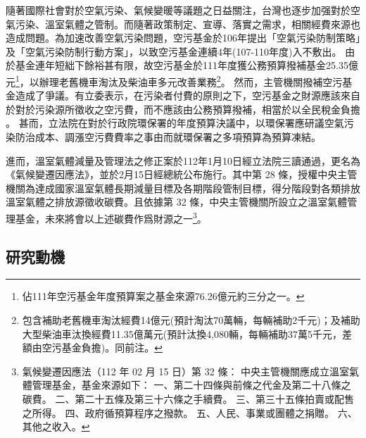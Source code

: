 \documentclass[12pt,a4paper]{article}
\begin{document}
隨著國際社會對於空氣污染、氣候變暖等議題之日益關注，台灣也逐步加强對於空氣污染、溫室氣體之管制。而隨著政策制定、宣導、落實之需求，相關經費來源也造成問題。為加速改善空氣污染問題，空污基金於106年提出「空氣污染防制策略」及「空氣污染防制行動方案」，以致空污基金連續4年(107-110年度)入不敷出。
由於基金連年短絀下餘裕甚有限，故空污基金於111年度獲公務預算撥補基金25.35億元\footnote{佔111年空污基金年度預算案之基金來源76.26億元約三分之一。}，以辦理老舊機車淘汰及柴油車多元改善業務\footnote{包含補助老舊機車淘汰經費14億元(預計淘汰70萬輛，每輛補助2千元)；及補助大型柴油車汰換經費11.35億萬元(預計汰換4,080輛，每輛補助37萬5千元，差額由空污基金負擔)。同前注。}。
然而，主管機關撥補空污基金造成了爭議。有立委表示，在污染者付費的原則之下，空污基金之財源應該來自於對於污染源所徵收之空污費，而不應該由公務預算撥補，相當於以全民稅金負擔
。
甚而，立法院在對於行政院環保署的年度預算決議中，以環保署應研議空氣污染防治成本、調漲空污費費率之事由而就環保署之多項預算為預算凍結。

進而，溫室氣體減量及管理法之修正案於112年1月10日經立法院三讀通過，更名為《氣候變遷因應法》，並於2月15日經總統公布施行。其中第 28 條，授權中央主管機關為達成國家溫室氣體長期減量目標及各期階段管制目標，得分階段對各類排放溫室氣體之排放源徵收碳費。且依據第 32 條，中央主管機關所設立之溫室氣體管理基金，未來將會以上述碳費作爲財源之一\footnote{氣候變遷因應法（112 年 02 月 15 日）第 32 條：
中央主管機關應成立溫室氣體管理基金，基金來源如下：
一、第二十四條與前條之代金及第二十八條之碳費。
二、第二十五條及第三十六條之手續費。
三、第三十五條拍賣或配售之所得。
四、政府循預算程序之撥款。
五、人民、事業或團體之捐贈。
六、其他之收入。}。



\subsection{研究動機}
\end{document}
